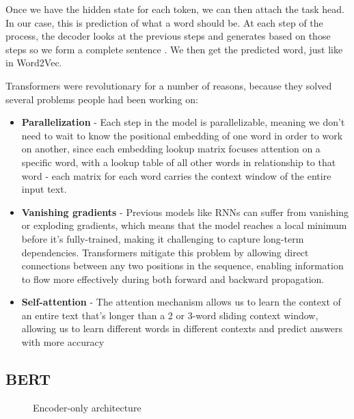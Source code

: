 \documentclass[11pt, table]{diazessay} %
\begin{document}
\begin{sloppypar}
Once we have the hidden state for each token, we can then attach the task head. In our case, this is prediction of what a word should be.  At each step of the process, the decoder looks at the previous steps and generates based on those steps so we form a complete sentence \citep{rush2018annotated}. We then get the predicted word, just like in Word2Vec.

Transformers were revolutionary for a number of reasons, because they solved several problems people had been working on:
\begin{itemize}
\item\textbf{Parallelization} - Each step in the model is parallelizable, meaning we don't need to wait to know the positional embedding of one word in order to work on another, since each embedding lookup matrix focuses attention on a specific word, with a lookup table of all other words in relationship to that word - each matrix for each word carries the context window of the entire input text.
\item\textbf{Vanishing gradients} - Previous models like RNNs can suffer from vanishing or exploding gradients, which means that the model reaches a local minimum before it's fully-trained, making it challenging to capture long-term dependencies. Transformers mitigate this problem by allowing direct connections between any two positions in the sequence, enabling information to flow more effectively during both forward and backward propagation.
\item\textbf{Self-attention} - The attention mechanism allows us to learn the context of an entire text that's longer than a 2 or 3-word sliding context window, allowing us to learn different words in different contexts and predict answers with more accuracy
\end{itemize}


\subsection{BERT}

\begin{figure}[H]
\caption{Encoder-only architecture}
\end{figure}


\end{sloppypar}
\end{document}
